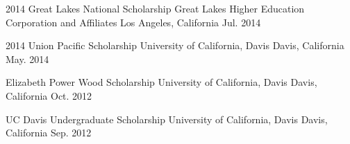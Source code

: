 



\begin{cvhonors}

  \cvhonor
    {2014 Great Lakes National Scholarship} %
    {Great Lakes Higher Education Corporation and Affiliates} %
    {Los Angeles, California} %
    {Jul. 2014} %

\end{cvhonors}




\begin{cvhonors}

  \cvhonor
    {2014 Union Pacific Scholarship} %
    {University of California, Davis} %
    {Davis, California} %
    {May. 2014} %

  \cvhonor
    {Elizabeth Power Wood Scholarship} %
    {University of California, Davis} %
    {Davis, California} %
    {Oct. 2012} %

  \cvhonor
    {UC Davis Undergraduate Scholarship} %
    {University of California, Davis} %
    {Davis, California} %
    {Sep. 2012} %

\end{cvhonors}
